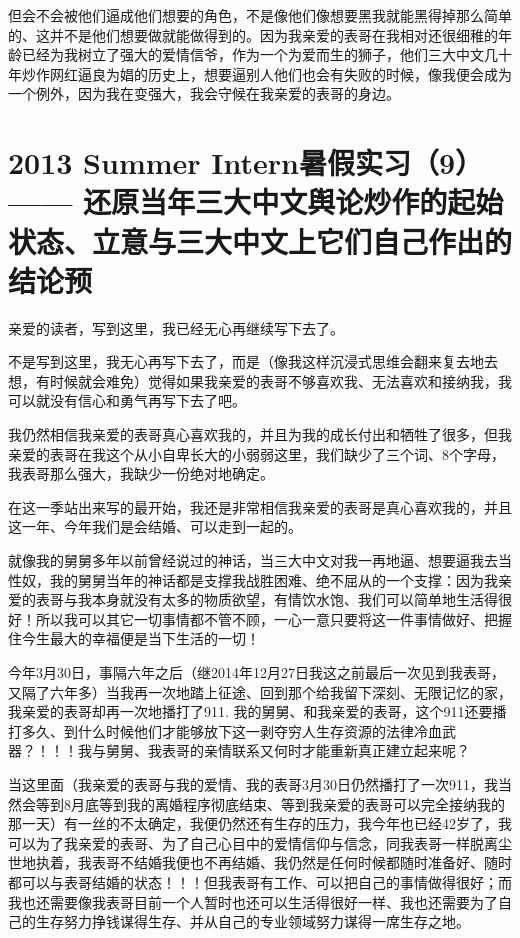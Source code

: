 \documentclass[9pt, b5paper]{article}
\begin{document}
但会不会被他们逼成他们想要的角色，不是像他们像想要黑我就能黑得掉那么简单的、这并不是他们想要做就能做得到的。因为我亲爱的表哥在我相对还很细稚的年龄已经为我树立了强大的爱情信爷，作为一个为爱而生的狮子，他们三大中文几十年炒作网红逼良为娼的历史上，想要逼别人他们也会有失败的时候，像我便会成为一个例外，因为我在变强大，我会守候在我亲爱的表哥的身边。

\section{2013 Summer Intern暑假实习（9）—— 还原当年三大中文舆论炒作的起始状态、立意与三大中文上它们自己作出的结论预}
\label{sec:orgf9db313}

亲爱的读者，写到这里，我已经无心再继续写下去了。

不是写到这里，我无心再写下去了，而是（像我这样沉浸式思维会翻来复去地去想，有时候就会难免）觉得如果我亲爱的表哥不够喜欢我、无法喜欢和接纳我，我可以就没有信心和勇气再写下去了吧。 

我仍然相信我亲爱的表哥真心喜欢我的，并且为我的成长付出和牺牲了很多，但我亲爱的表哥在我这个从小自卑长大的小弱弱这里，我们缺少了三个词、8个字母，我表哥那么强大，我缺少一份绝对地确定。

在这一季站出来写的最开始，我还是非常相信我亲爱的表哥是真心喜欢我的，并且这一年、今年我们是会结婚、可以走到一起的。

就像我的舅舅多年以前曾经说过的神话，当三大中文对我一再地逼、想要逼我去当性奴，我的舅舅当年的神话都是支撑我战胜困难、绝不屈从的一个支撑：因为我亲爱的表哥与我本身就没有太多的物质欲望，有情饮水饱、我们可以简单地生活得很好！所以我可以其它一切事情都不管不顾，一心一意只要将这一件事情做好、把握住今生最大的幸福便是当下生活的一切！

今年3月30日，事隔六年之后（继2014年12月27日我这之前最后一次见到我表哥，又隔了六年多）当我再一次地踏上征途、回到那个给我留下深刻、无限记忆的家，我亲爱的表哥却再一次地播打了911. 我的舅舅、和我亲爱的表哥，这个911还要播打多久、到什么时候他们才能够放下这一剥夺穷人生存资源的法律冷血武器？！！！我与舅舅、我表哥的亲情联系又何时才能重新真正建立起来呢？  


当这里面（我亲爱的表哥与我的爱情、我的表哥3月30日仍然播打了一次911，我当然会等到8月底等到我的离婚程序彻底结束、等到我亲爱的表哥可以完全接纳我的那一天）有一丝的不太确定，我便仍然还有生存的压力，我今年也已经42岁了，我可以为了我亲爱的表哥、为了自己心目中的爱情信仰与信念，同我表哥一样脱离尘世地执着，我表哥不结婚我便也不再结婚、我仍然是任何时候都随时准备好、随时都可以与表哥结婚的状态！！！但我表哥有工作、可以把自己的事情做得很好；而我也还需要像我表哥目前一个人暂时也还可以生活得很好一样、我也还需要为了自己的生存努力挣钱谋得生存、并从自己的专业领域努力谋得一席生存之地。
\end{document}
